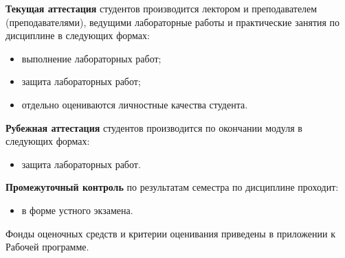 \textbf{Текущая аттестация} студентов производится лектором и преподавателем (преподавателями), ведущими лабораторные работы и практические занятия по дисциплине в следующих формах:
\begin{itemize}


\item выполнение лабораторных работ;
\item защита лабораторных работ;
\item отдельно оцениваются личностные качества студента.
\end{itemize}

\textbf{Рубежная аттестация} студентов производится по окончании модуля в следующих формах:
\begin{itemize}
\item защита лабораторных работ.
\end{itemize}

\textbf{Промежуточный контроль} по результатам семестра по дисциплине проходит:
\begin{itemize}
\item в форме устного экзамена.
\end{itemize}

Фонды оценочных средств и критерии оценивания приведены в приложении к Рабочей программе.

